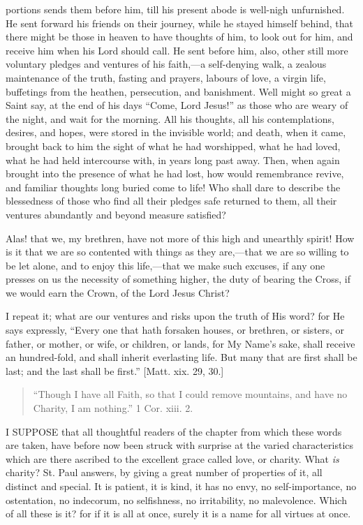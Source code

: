 portions sends them before him, till his present abode is well-nigh
unfurnished. He sent forward his friends on their journey, while he
stayed himself behind, that there might be those in heaven to have
thoughts of him, to look out for him, and receive him when his Lord
should call. He sent before him, also, other still more voluntary
pledges and ventures of his faith,—a self-denying walk, a zealous
maintenance of the truth, fasting and prayers, labours of love, a
virgin life, buffetings from the heathen, persecution, and banishment.
Well might so great a Saint say, at the end of his days ``Come,
Lord Jesus!'' as those who are weary of the night, and wait for
the morning. All his thoughts, all his contemplations, desires, and
hopes, were stored in the invisible world; and death, when it came,
brought back to him the sight of what he had worshipped, what he had
loved, what he had held intercourse with, in years long past away.
Then, when again brought into the presence of what he had lost, how
would remembrance revive, and familiar thoughts long buried come to
life! Who shall dare to describe the blessedness of those who find all
their pledges safe returned to them, all their ventures abundantly and
beyond measure satisfied?

Alas! that we, my brethren, have not more of this high and
unearthly spirit! How is it that we are so contented with things as
they are,—that we are so willing to be let alone, and to enjoy this
life,—that we make such excuses, if any one presses on us the
necessity of something higher, the duty of bearing the Cross, if we
would earn the Crown, of the Lord Jesus Christ?

I repeat it; what are our ventures and risks upon the truth of His
word? for He says expressly, ``Every one that hath forsaken
houses, or brethren, or sisters, or father, or mother, or wife, or
children, or lands, for My Name's sake, shall receive an hundred-fold,
and shall inherit everlasting life. But many that are first shall be
last; and the last shall be first.'' [Matt. xix. 29, 30.]


\begin{quote}

``Though I have all Faith, so that I could remove mountains,
and have no Charity, I am nothing.'' 1 Cor. xiii. 2.

\end{quote}

I SUPPOSE that all thoughtful readers of the chapter from which
these words are taken, have before now been struck with surprise at
the varied characteristics which are there ascribed to the excellent
grace called love, or charity. What \emph{is} charity? St. Paul
answers, by giving a great number of properties of it, all distinct
and special. It is patient, it is kind, it has no envy, no
self-importance, no ostentation, no indecorum, no selfishness, no
irritability, no malevolence. Which of all these is it? for if it is
all at once, surely it is a name for all virtues at once.

